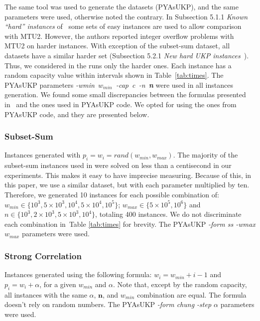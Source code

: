 The same tool was used to generate the datasets (PYAsUKP), and the same parameters were used, otherwise noted the contrary. 
In Subsection 5.1.1 \emph{Known ``hard'' instances} of~\cite{pya} some sets of easy instances are used to allow comparison with MTU2. 
However, the authors reported integer overflow problems with MTU2 on harder instances. 
With exception of the subset-sum dataset, all datasets have a similar harder set (Subsection 5.2.1 \emph{New hard UKP instances}~\cite{pya}).
Thus, we considered in the runs only the harder ones. 
Each instance has a random capacity value within intervals shown in Table~\ref{tab:times}. 
The PYAsUKP parameters \mbox{\emph{-wmin \(w_{min}\) -cap c -n \textbf{n}}} were used in all instances generation. 
We found some small discrepancies between the formulas presented in~\cite{pya} and the ones used in PYAsUKP code.
We opted for using the ones from  PYAsUKP code, and they are presented below.

\subsubsection{Subset-Sum}\label{sec:subsetsum}
Instances generated with \(p_i = w_i = rand(w_{min}, w_{max})\). 
The majority of the subset-sum instances used in \cite{pya} were solved on less than a centisecond in our experiments. 
This makes it easy to have imprecise measuring. 
Because of this, in this paper, we use a similar dataset, but with each parameter multiplied by ten. 
Therefore, we generated 10 instances for each possible combination of: \(w_{min} \in \{10^3, 5\times10^3, 10^4, 5\times10^4, 10^5\}\); \(w_{max} \in \{5\times10^5, 10^6\}\) and \(n \in \{10^3, 2\times10^3, 5\times10^3, 10^4\}\), totaling 400 instances. We do not discriminate each combination in~Table \ref{tab:times} for brevity. The PYAsUKP \emph{-form ss -wmax \(w_{max}\)} parameters were used.

\subsubsection{Strong Correlation}
Instances generated using the following formula: \(w_i = w_{min} + i - 1\) and \(p_i = w_i + \alpha\), for a given \(w_{min}\) and \(\alpha\).  Note that, except by the random capacity, all instances with the same \(\alpha\), \(\mathbf{n}\), and \(w_{min}\) combination are equal. The formula doesn't rely on random numbers. The PYAsUKP \emph{-form chung -step \(\alpha\) } parameters were used.

